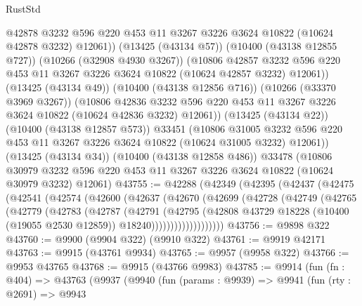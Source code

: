 \begin{lexlean}{RustStd}
\begin{coremodule}
              @42878
              @3232
              @596
              @220
              @453
              @11
              @3267
              @3226
              @3624
              @10822
              (@10624 @42878 @3232)
              @12061))
          (@13425 (@43134 @57))
          (@10400 (@43138 @12855 @727))
          (@10266 (@32908 @4930 @3267))
          (@10806
            @42857
            @3232
            @596
            @220
            @453
            @11
            @3267
            @3226
            @3624
            @10822
            (@10624 @42857 @3232)
            @12061))
        (@13425 (@43134 @49))
        (@10400 (@43138 @12856 @716))
        (@10266 (@33370 @3969 @3267))
        (@10806
          @42836
          @3232
          @596
          @220
          @453
          @11
          @3267
          @3226
          @3624
          @10822
          (@10624 @42836 @3232)
          @12061))
      (@13425 (@43134 @22))
      (@10400 (@43138 @12857 @573))
      @33451
      (@10806
        @31005
        @3232
        @596
        @220
        @453
        @11
        @3267
        @3226
        @3624
        @10822
        (@10624 @31005 @3232)
        @12061))
    (@13425 (@43134 @34))
    (@10400 (@43138 @12858 @486))
    @33478
    (@10806 @30979 @3232 @596 @220 @453 @11 @3267 @3226 @3624 @10822 (@10624 @30979 @3232) @12061)
@43755 := @42288
    (@42349
      (@42395
        (@42437
          (@42475
            (@42541
              (@42574
                (@42600
                  (@42637
                    (@42670
                      (@42699
                        (@42728
                          (@42749
                            (@42765
                              (@42779
                                (@42783
                                  (@42787
                                    (@42791
                                      (@42795
                                        (@42808
                                          @43729
                                          @18228
                                          (@10400 (@19055 @2530 @12859))
                                          @18240)))))))))))))))))))
@43756 := @9898 @322
@43760 := @9900 (@9904 @322) (@9910 @322)
@43761 := @9919 @42171
@43763 := @9915 (@43761 @9934)
@43765 := @9957 (@9958 @322)
@43766 := @9953 @43765
@43768 := @9915 (@43766 @9983)
@43785 := @9914
    (fun (fn : @404) =>
    @43763
      (@9937
        (@9940
          (fun (params : @9939) =>
          @9941
            (fun (rty : @2691) =>
            @9943

\end{coremodule}
\end{lexlean}
